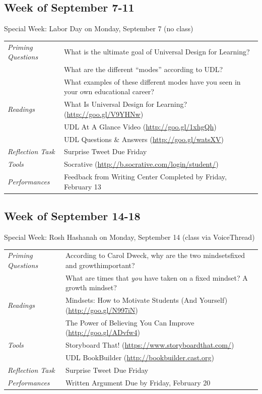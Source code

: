 \documentclass{tufte-handout}
\newcommand{\tabpq}{\faQuestionSign\medspace\textit{Priming Questions}}
\newcommand{\tabread}{\faBook\medspace\textit{Readings}}
\newcommand{\tabtools}{\faWrench\medspace\textit{Tools}}
\newcommand{\tabtweet}{\faLightbulb\medspace\textit{Reflection Task} & Surprise Tweet Due Friday \\}
\newcommand{\tabperformance}{\faTasks\medspace\textit{Performances}}
\newenvironment{tabsched}
	{\small
	\begin{tabular}{p{1.5in}p{5in}}
	\toprule}
	{\bottomrule
	\end{tabular}
	\normalsize}
\newenvironment{specweek}
	{\begin{center}
		\fontseries{b} \faBullhorn \medspace Special Week: }
		{\medspace \faBullhorn \fontseries{m}
	\end{center}}
\newcommand{\weekfour}{September 7-11}
\newcommand{\weekfive}{September 14-18}
\newcommand{\laborday}{Labor Day on Monday, September 7 (no class)}
\newcommand{\roshhashanah}{Rosh Hashanah on Monday, September 14 (class via VoiceThread)}
\begin{document}
\subsection{Week of \weekfour}

\begin{specweek}\laborday\end{specweek}

\begin{tabsched}
	\tabpq & What is the ultimate goal of Universal Design for Learning? \\
	& What are the different \enquote{modes} according to UDL? \\
	& What examples of these different modes have you seen in your own educational career? \\
	\midrule
	\tabread & What Is Universal Design for Learning? (\url{http://goo.gl/V9YHNw}) \\
	& UDL At A Glance Video (\url{http://goo.gl/1xhgQh}) \\
	& UDL Questions \& Answers (\url{http://goo.gl/watsXV}) \\
	\midrule
	\tabtweet
	\midrule
	\tabtools & Socrative (\url{http://b.socrative.com/login/student/}) \\
	\midrule
	\tabperformance & Feedback from Writing Center Completed by Friday, February 13 \\
\end{tabsched}
\newpage
\subsection{Week of \weekfive}

\begin{specweek}\roshhashanah\end{specweek}

\begin{tabsched}
	\tabpq & According to Carol Dweck, why are the two mindsets\textemdash{}fixed and growth\textemdash{}important? \\
	& What are times that \emph{you} have taken on a fixed mindset? A growth mindset? \\
	\midrule
	\tabread & Mindsets: How to Motivate Students (And Yourself) (\url{http://goo.gl/N997iN}) \\
	& The Power of Believing You Can Improve (\url{http://goo.gl/ADvfw4}) \\
	\midrule
	\tabtools & Storyboard That! (\url{https://www.storyboardthat.com/}) \\
	& UDL BookBuilder (\url{http://bookbuilder.cast.org}) \\
	\midrule
	\tabtweet
	\midrule
	\tabperformance & Written Argument Due by Friday, February 20 \\
\end{tabsched}
\end{document}
